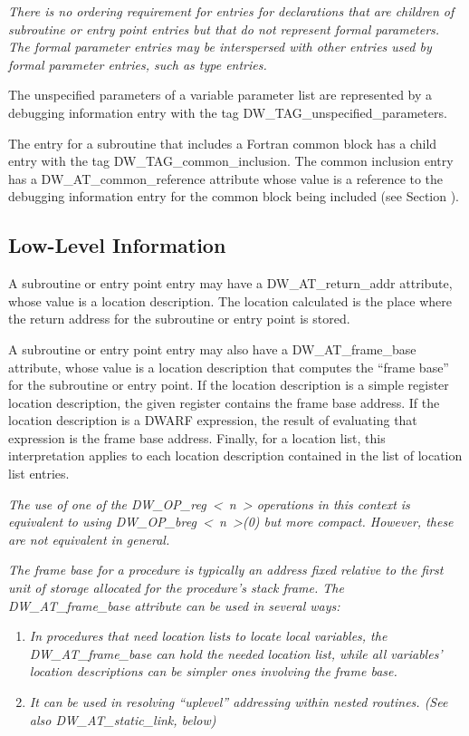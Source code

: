 \textit{There is no ordering requirement for entries for declarations
that are children of subroutine or entry point entries but
that do not represent formal parameters. The formal parameter
entries may be interspersed with other entries used by formal
parameter entries, such as type entries.}

The unspecified parameters of a variable parameter list are
represented by a debugging information entry with the tag
DW\_TAG\_unspecified\_parameters.

The entry for a subroutine that includes a Fortran common block
has a child entry with the tag 
DW\-\_TAG\-\_common\-\_inclusion. The
common inclusion entry has a 
DW\-\_AT\-\_common\-\_reference attribute
whose value is a reference to the debugging information entry
for the common block being included 
(see Section ).

\subsection{Low-Level Information}
\label{chap:lowlevelinformation}

A subroutine or entry point entry may have a DW\_AT\_return\_addr
attribute, whose value is a location description. The location
calculated is the place where the return address for the
subroutine or entry point is stored.

A subroutine or entry point entry may also have a
DW\_AT\_frame\_base attribute, whose value is a location
description that computes the “frame base” for the
subroutine or entry point. If the location description is
a simple register location description, the given register
contains the frame base address. If the location description is
a DWARF expression, the result of evaluating that expression
is the frame base address. Finally, for a location list,
this interpretation applies to each location description
contained in the list of location list entries.

\textit{The use of one of the DW\_OP\_reg~\textless~n~\textgreater 
operations in this
context is equivalent to using 
DW\_OP\_breg~\textless~n~\textgreater(0) 
but more
compact. However, these are not equivalent in general.}

\textit{The frame base for a procedure is typically an address fixed
relative to the first unit of storage allocated for the
procedure’s stack frame. The DW\_AT\_frame\_base attribute
can be used in several ways:}

\begin{enumerate}[1.]
\item \textit{In procedures that need location lists to locate local
variables, the DW\_AT\_frame\_base can hold the needed location
list, while all variables’ location descriptions can be
simpler ones involving the frame base.}

\item \textit{It can be used in resolving ``up\dash level'' addressing
within nested routines. 
(See also DW\_AT\_static\_link, below)}
\end{enumerate}

